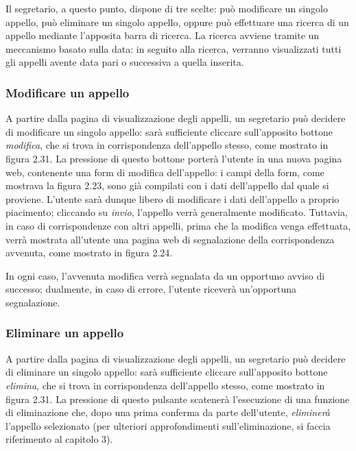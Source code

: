 \documentclass [a4paper,11pt]{book}
\begin{document}

Il segretario, a questo punto, dispone di tre scelte: può modificare un singolo appello, può eliminare un singolo appello, oppure può effettuare una ricerca di un appello mediante l'apposita barra di ricerca. La ricerca avviene tramite un meccanismo basato sulla data: in seguito alla ricerca, verranno visualizzati tutti gli appelli avente data pari o successiva a quella inserita.

\medskip

\subsubsection{Modificare un appello}

A partire dalla pagina di visualizzazione degli appelli, un segretario può decidere di modificare un singolo appello: sarà sufficiente cliccare sull'apposito bottone \emph{modifica}, che si trova in corrispondenza dell'appello stesso, come mostrato in figura 2.31. La pressione di questo bottone porterà l'utente in una nuova pagina web, contenente una form di modifica dell'appello: i campi della form, come mostrava la figura 2.23, sono già compilati con i dati dell'appello dal quale si proviene. L'utente sarà dunque libero di modificare i dati dell'appello a proprio piacimento; cliccando su \emph{invio}, l'appello verrà generalmente modificato. Tuttavia, in caso di corrispondenze con altri appelli, prima che la modifica venga effettuata, verrà mostrata all'utente una pagina web di segnalazione della corrispondenza avvenuta, come mostrato in figura 2.24.

In ogni caso, l'avvenuta modifica verrà segnalata da un opportuno avviso di successo; dualmente, in caso di errore, l'utente riceverà un'opportuna segnalazione.

\medskip

\subsubsection{Eliminare un appello}

A partire dalla pagina di visualizzazione degli appelli, un segretario può decidere di eliminare un singolo appello: sarà sufficiente cliccare sull'apposito bottone \emph{elimina}, che si trova in corrispondenza dell'appello stesso, come mostrato in figura 2.31. La pressione di questo pulsante scatenerà l'esecuzione di una funzione di eliminazione che, dopo una prima conferma da parte dell'utente, \emph{eliminerà} l'appello selezionato (per ulteriori approfondimenti sull'eliminazione, si faccia riferimento al capitolo 3).
\end{document}
